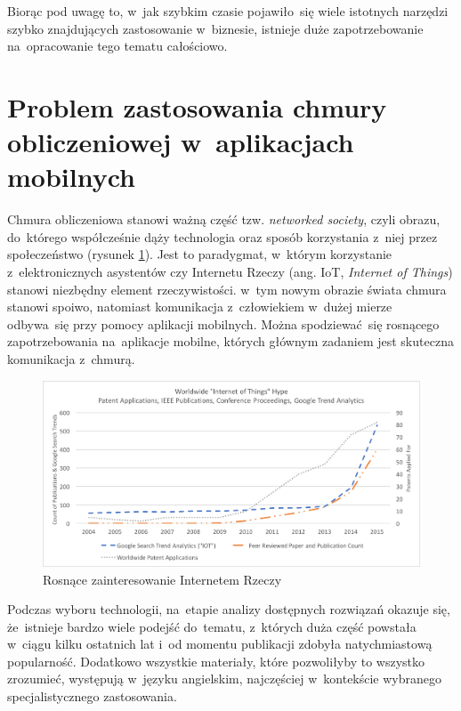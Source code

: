 \documentclass[12pt,a4paper,twoside,titlepage,openright]{book}
\begin{document}
Biorąc pod uwagę to, w~jak szybkim czasie pojawiło~się wiele istotnych narzędzi szybko znajdujących zastosowanie w~biznesie, istnieje duże zapotrzebowanie na~opracowanie tego tematu całościowo. 

\section*{Problem zastosowania chmury obliczeniowej w~aplikacjach mobilnych}

Chmura obliczeniowa stanowi ważną część tzw. \textit{networked society}, czyli obrazu, do~którego współcześnie dąży technologia oraz sposób korzystania z~niej przez społeczeństwo (rysunek \ref{fig:iot-hype}). Jest to paradygmat, w~którym korzystanie z~elektronicznych asystentów czy Internetu Rzeczy (ang. IoT, \textit{Internet of Things}) stanowi niezbędny element rzeczywistości.\cite{ccSpringer} w~tym nowym obrazie świata chmura stanowi spoiwo, natomiast komunikacja z~człowiekiem w~dużej mierze odbywa~się przy pomocy aplikacji mobilnych. Można spodziewać~się rosnącego zapotrzebowania na~aplikacje mobilne, których głównym zadaniem jest skuteczna komunikacja z~chmurą. 

\begin{figure}[h]
	\centering
			\includegraphics[width=\textwidth]{iot-hype.png}
		\caption{Rosnące zainteresowanie Internetem Rzeczy \cite{iotArchitects}}
		\label{fig:iot-hype}
\end{figure}

Podczas wyboru technologii, na~etapie analizy dostępnych rozwiązań okazuje się, że~istnieje bardzo wiele podejść do~tematu, z~których duża część powstała w~ciągu kilku ostatnich lat i~od momentu publikacji zdobyła natychmiastową popularność. Dodatkowo wszystkie materiały, które pozwoliłyby to wszystko zrozumieć, występują w~języku angielskim, najczęściej w~kontekście wybranego specjalistycznego zastosowania. 
\end{document}
